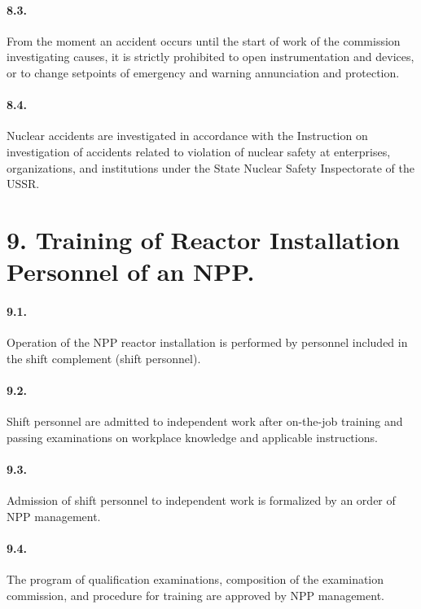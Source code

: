 \documentclass[openright]{bookest}
\begin{document}
\paragraph{8.3.} From the moment an accident occurs until the start of work of the commission investigating causes, it is strictly prohibited to open instrumentation and devices, or to change setpoints of emergency and warning annunciation and protection.

\paragraph{8.4.} Nuclear accidents are investigated in accordance with the Instruction on investigation of accidents related to violation of nuclear safety at enterprises, organizations, and institutions under the State Nuclear Safety Inspectorate of the USSR.

\section*{9. Training of Reactor Installation Personnel of an NPP.}

\paragraph{9.1.} Operation of the NPP reactor installation is performed by personnel included in the shift complement (shift personnel).

\paragraph{9.2.} Shift personnel are admitted to independent work after on-the-job training and passing examinations on workplace knowledge and applicable instructions.

\paragraph{9.3.} Admission of shift personnel to independent work is formalized by an order of NPP management.

\paragraph{9.4.} The program of qualification examinations, composition of the examination commission, and procedure for training are approved by NPP management.
\end{document}
